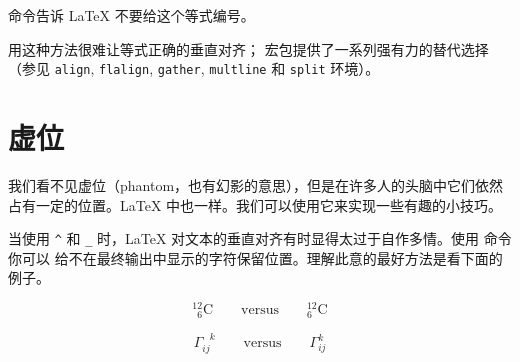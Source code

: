 %

\noindent{} 命令告诉 \LaTeX{} 不要给这个等式编号。

用这种方法很难让等式正确的垂直对齐； 宏包提供了一系列强有力的替代选择（参见 
\verb|align|, \verb|flalign|, \verb|gather|,
\verb|multline| 和 \verb|split| 环境）。


\section{虚位}

%
我们看不见虚位（phantom，也有幻影的意思），但是在许多人的头脑中它们依然占有一定的位置。\LaTeX{} 中也一样。我们可以使用它来实现一些有趣的小技巧。

当使用 \verb|^| 和 \verb|_| 时，\LaTeX{} 对文本的垂直对齐有时显得太过于自作多情。使用  命令你可以
给不在最终输出中显示的字符保留位置。理解此意的最好方法是看下面的例子。
\begin{example}
\begin{displaymath}
{}^{12}_{\phantom{1}6}\textrm{C}
\qquad \textrm{versus} \qquad
{}^{12}_{6}\textrm{C}
\end{displaymath}
\end{example}
\begin{example}
\begin{displaymath}
\Gamma_{ij}^{\phantom{ij}k}
\qquad \textrm{versus} \qquad
\Gamma_{ij}^{k}
\end{displaymath}
\end{example}


